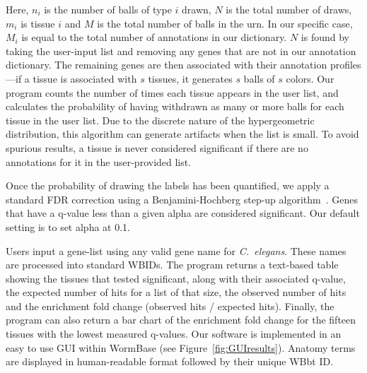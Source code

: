 \documentclass{bmcart}
\begin{document}
Here, $n_i$ is the number of balls of type $i$ drawn, $N$ is the total number  of draws, $m_i$ is tissue $i$ and $M$ is the total number of balls in the urn. In our specific case, $M_i$ is equal to the total number of annotations in our dictionary. $N$ is found by taking the user-input list and removing any genes that are not in our annotation dictionary. The remaining genes are then associated with their annotation profiles---if a tissue is associated with $s$ tissues, it generates $s$ balls of $s$ colors. Our program counts the number of times each tissue appears in the user list, and calculates the probability of having withdrawn as many or more balls for each tissue in the user list. Due to the discrete nature of the hypergeometric distribution, this algorithm can generate artifacts when the list is small. To avoid spurious results, a tissue is never considered significant if there are no annotations for it in the user-provided list.

Once the probability of drawing the labels has been quantified, we apply a standard FDR correction using a Benjamini-Hochberg step-up algorithm~\cite{Benjamini1995}. Genes that have a q-value less than a given alpha are considered significant. Our default setting is to set alpha at 0.1. 

Users input a gene-list using any valid gene name for \emph{C.~elegans}. These names are processed into standard WBIDs. The program returns a text-based table showing the tissues that tested significant, along with their associated q-value, the expected number of hits for a list of that size, the observed number of hits and the enrichment fold change (observed hits / expected hits). Finally, the program can also return a bar chart of the enrichment fold change for the fifteen tissues with the lowest measured q-values. Our software is implemented in an easy to use GUI within WormBase (see Figure~\ref{fig:GUIresults}). Anatomy terms are displayed in human-readable format followed by their unique WBbt ID.
\end{document}
